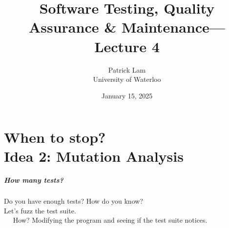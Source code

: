 \documentclass{beamer}
\title{Software Testing, Quality Assurance \& Maintenance---Lecture 4}
\author{Patrick Lam\\University of Waterloo}
\date{January 15, 2025}
\newenvironment{changemargin}[1]{%
  \begin{list}{}{%
    \setlength{\topsep}{0pt}%
    \setlength{\leftmargin}{#1}%
    \setlength{\rightmargin}{1em}
    \setlength{\listparindent}{\parindent}%
    \setlength{\itemindent}{\parindent}%
    \setlength{\parsep}{\parskip}%
  }%
  \item[]}{\end{list}}
\begin{document}
\begin{frame}
  \titlepage
\end{frame}

\part{When to stop? \\ Idea 2: Mutation Analysis}
\begin{frame}
  \partpage
\end{frame}

\begin{frame}
  \frametitle{How many tests?}
  \Large
  \begin{changemargin}{2em}
    Do you have enough tests? How do you know?\\[1em]

    Let's fuzz the test suite.\\
    ~~ How? Modifying the program and seeing if the test suite notices.
  \end{changemargin}
\end{frame}
\end{document}
